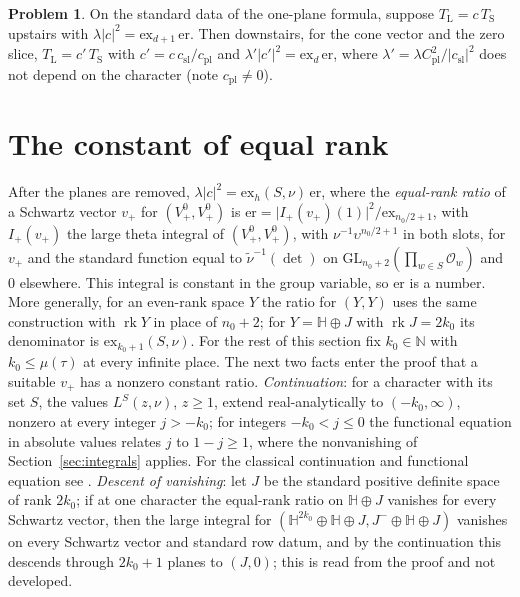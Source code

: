 \documentclass[reqno]{amsart}
\theoremstyle{definition}
\newtheorem{problem}{Problem}[section]
\theoremstyle{plain}
\newcommand{\Oc}{\mathcal O}
\newcommand{\ex}{\mathrm{ex}}
\newcommand{\GL}{\mathrm{GL}}
\begin{document}
\begin{problem}\label{pr:one-plane}
On the standard data of the one-plane formula, suppose \(T_{\mathrm L} = c\,T_{\mathrm S}\) upstairs with \(\lambda\lvert c\rvert^2 = \ex_{d+1}\,\mathrm{er}\).  Then downstairs, for the cone vector and the zero slice, \(T_{\mathrm L} = c'\,T_{\mathrm S}\) with \(c' = c\,c_{\mathrm{sl}}/c_{\mathrm{pl}}\) and \(\lambda'\lvert c'\rvert^2 = \ex_d\,\mathrm{er}\), where \(\lambda' = \lambda C_{\mathrm{pl}}^2/\lvert c_{\mathrm{sl}}\rvert^2\) does not depend on the character (note \(c_{\mathrm{pl}} \ne 0\)).
\end{problem}

\section{The constant of equal rank}\label{sec:equal}

After the planes are removed, \(\lambda\lvert c\rvert^2 = \ex_h(S,\nu)\,\mathrm{er}\), where the \emph{equal-rank ratio} of a Schwartz vector \(v_+\) for \((V^0_+, V^0_+)\) is \(\mathrm{er} = \lvert I_+(v_+)(1)\rvert^2/\ex_{n_0/2+1}\), with \(I_+(v_+)\) the large theta integral of \((V^0_+, V^0_+)\), with \(\nu^{-1}\upsilon^{n_0/2+1}\) in both slots, for \(v_+\) and the standard function equal to \(\tilde\nu^{-1}(\det)\) on \(\GL_{n_0+2}(\prod_{w \in S}\Oc_w)\) and \(0\) elsewhere.  This integral is constant in the group variable, so \(\mathrm{er}\) is a number.  More generally, for an even-rank space \(Y\) the ratio for \((Y,Y)\) uses the same construction with \(\operatorname{rk}Y\) in place of \(n_0+2\); for \(Y = \mathbb H \oplus J\) with \(\operatorname{rk}J = 2k_0\) its denominator is \(\ex_{k_0+1}(S,\nu)\).  For the rest of this section fix \(k_0 \in \mathbb N\) with \(k_0 \le \mu(\tau)\) at every infinite place.  The next two facts enter the proof that a suitable \(v_+\) has a nonzero constant ratio.  \emph{Continuation}: for a character with its set \(S\), the values \(L^S(z,\nu)\), \(z \ge 1\), extend real-analytically to \((-k_0,\infty)\), nonzero at every integer \(j > -k_0\); for integers \(-k_0 < j \le 0\) the functional equation in absolute values relates \(j\) to \(1-j \ge 1\), where the nonvanishing of Section~\ref{sec:integrals} applies.  For the classical continuation and functional equation see \cite[Ch.~XV, \S\S4.4--4.5]{CF}.  \emph{Descent of vanishing}: let \(J\) be the standard positive definite space of rank \(2k_0\); if at one character the equal-rank ratio on \(\mathbb H \oplus J\) vanishes for every Schwartz vector, then the large integral for \((\mathbb H^{2k_0} \oplus \mathbb H \oplus J, J^- \oplus \mathbb H \oplus J)\) vanishes on every Schwartz vector and standard row datum, and by the continuation this descends through \(2k_0+1\) planes to \((J, 0)\); this is read from the proof and not developed.
\end{document}
